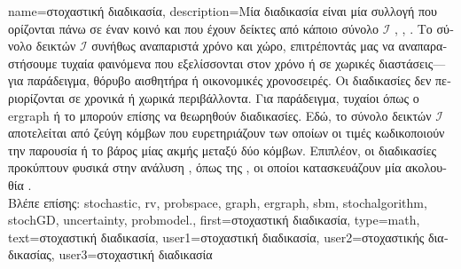 {name={\foreignlanguage{greek}{στοχαστική διαδικασία}},
	description={\foreignlanguage{greek}{Μία}  
		\foreignlanguage{greek}{διαδικασία είναι μία συλλογή}  \foreignlanguage{greek}{που ορίζονται πάνω 
		σε έναν κοινό}  \foreignlanguage{greek}{και που έχουν δείκτες από κάποιο σύνολο}
		$\mathcal{I}$ \cite{Brockwell91}, \cite{GrayProbBook}, \cite{papoulis}. \foreignlanguage{greek}{Το σύνολο δεικτών 
		$\mathcal{I}$ συνήθως αναπαριστά χρόνο και χώρο, επιτρέποντάς μας να αναπαραστήσουμε τυχαία φαινόμενα που 
		εξελίσσονται στον χρόνο ή σε χωρικές διαστάσεις—για παράδειγμα, θόρυβο αισθητήρα ή οικονομικές χρονοσειρές}.
		\foreignlanguage{greek}{Οι}  \foreignlanguage{greek}{διαδικασίες δεν περιορίζονται σε 
		χρονικά ή χωρικά περιβάλλοντα. Για παράδειγμα, τυχαίοι}  \foreignlanguage{greek}{όπως ο} 
		\gls{ergraph} \foreignlanguage{greek}{ή το}  \foreignlanguage{greek}{μπορούν επίσης να θεωρηθούν} 
		 \foreignlanguage{greek}{διαδικασίες. Εδώ, το σύνολο δεικτών $\mathcal{I}$ αποτελείται 
		από ζεύγη κόμβων που ευρετηριάζουν}  \foreignlanguage{greek}{των οποίων οι τιμές κωδικοποιούν 
		την παρουσία ή το βάρος μίας ακμής μεταξύ δύο κόμβων. Επιπλέον, οι}  
		\foreignlanguage{greek}{διαδικασίες προκύπτουν φυσικά στην ανάλυση} , 
		\foreignlanguage{greek}{όπως της} , \foreignlanguage{greek}{οι οποίοι κατασκευάζουν μία 
		ακολουθία} . \\
		\foreignlanguage{greek}{Βλέπε επίσης:} \gls{stochastic}, \gls{rv}, \gls{probspace}, \gls{graph}, \gls{ergraph}, \gls{sbm},
		\gls{stochalgorithm}, \gls{stochGD}, \gls{uncertainty}, \gls{probmodel}.},
	first={\foreignlanguage{greek}{στοχαστική διαδικασία}},
	type=math, 
	text={\foreignlanguage{greek}{στοχαστική διαδικασία}},
	user1={\foreignlanguage{greek}{στοχαστική διαδικασία}}, %
  	user2={\foreignlanguage{greek}{στοχαστικής διαδικασίας}}, %
	user3={\foreignlanguage{greek}{στοχαστική διαδικασία}} %
}

